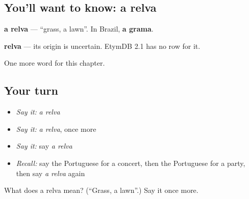 \subsection*{You'll want to know: a relva}
\textbf{a relva} — \textquotedblleft{}grass, a lawn\textquotedblright{}. In Brazil, \textbf{a grama}.

\begin{cousinweb}
\textbf{relva} — its origin is uncertain. EtymDB 2.1 has no row for it.
\end{cousinweb}

\begin{grammarlens}[title={What you've built}]
One more word for this chapter.
\end{grammarlens}

\subsection*{Your turn}
\begin{itemize}
\raggedright
  \item \emph{Say it:} \emph{a relva}
  \item \emph{Say it:} \emph{a relva}, once more
  \item \emph{Say it:} say \emph{a relva}
  \item \emph{Recall:} say the Portuguese for a concert, then the Portuguese for a party, then say \emph{a relva} again
\end{itemize}

\begin{tcolorbox}[breakable,colback=teal!4,colframe=teal!35!black,title={Before you move on}]
What does a relva mean? (\textquotedblleft{}Grass, a lawn\textquotedblright{}.) Say it once more.
\end{tcolorbox}
